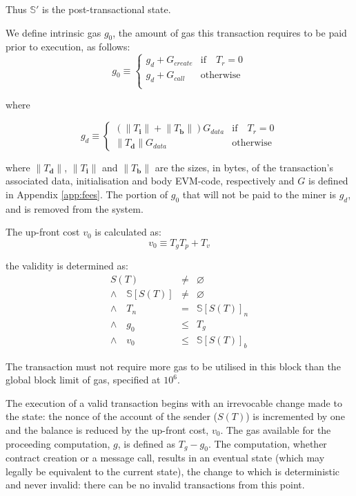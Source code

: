 \documentclass[9pt,oneside]{amsart}
\begin{document}
\begin{multicols}{2}
Thus $\mathbb{S}'$ is the post-transactional state.

We define intrinsic gas $g_0$, the amount of gas this transaction requires to be paid prior to execution, as follows:
\begin{equation}
g_0 \equiv \begin{cases}
g_d + G_{create} & \text{if} \quad T_r = 0 \\
g_d + G_{call} & \text{otherwise} \\
\end{cases}
\end{equation}

where

\begin{equation}
g_d \equiv \begin{cases} (\lVert T_\mathbf{i}\rVert + \lVert T_\mathbf{b}\rVert) G_{data} & \text{if} \quad T_r = 0 \\
 \lVert T_\mathbf{d}\rVert G_{data} & \text{otherwise}
 \end{cases}
\end{equation}

where $\lVert T_\mathbf{d}\rVert$, $\lVert T_\mathbf{i}\rVert$ and $\lVert T_\mathbf{b}\rVert$ are the sizes, in bytes, of the transaction's associated data, initialisation and body EVM-code, respectively and $G$ is defined in Appendix \ref{app:fees}. The portion of $g_0$ that will not be paid to the miner is $g_d$, and is removed from the system.


The up-front cost $v_0$ is calculated as:
\begin{equation}
v_0 \equiv T_g T_p + T_v
\end{equation}

the validity is determined as:
\begin{eqnarray}
S(T) & \neq & \varnothing \\ \wedge \quad \mathbb{S}[S(T)] & \neq & \varnothing \\ \wedge \quad T_n & = & \mathbb{S}[S(T)]_n \\ \wedge \quad g_0 & \leq & T_g \\ \wedge \quad v_0 & \leq & \mathbb{S}[S(T)]_b
\end{eqnarray}

The transaction must not require more gas to be utilised in this block than the global block limit of gas, specified at $10^6$.

The execution of a valid transaction begins with an irrevocable change made to the state: the nonce of the account of the sender ($S(T)$) is incremented by one and the balance is reduced by the up-front cost, $v_0$. The gas available for the proceeding computation, $g$, is defined as $T_g - g_0$. The computation, whether contract creation or a message call, results in an eventual state (which may legally be equivalent to the current state), the change to which is deterministic and never invalid: there can be no invalid transactions from this point.


\end{multicols}
\end{document}
